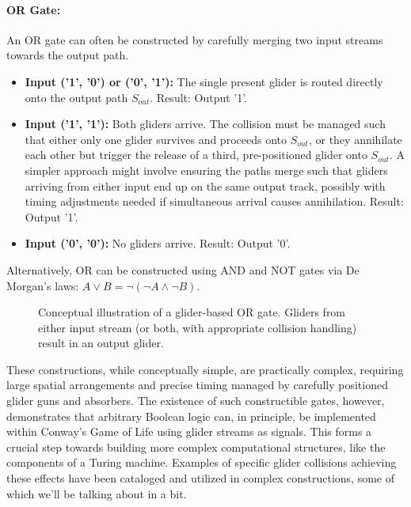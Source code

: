\documentclass{article}
\theoremstyle{definition}
\theoremstyle{plain}
\theoremstyle{plain}
\begin{document}
\paragraph{OR Gate:} An OR gate can often be constructed by carefully merging two input streams towards the output path.
\begin{itemize}
  \item \textbf{Input ('1', '0') or ('0', '1'):} The single present glider is routed directly onto the output path $S_{out}$. Result: Output '1'.
  \item \textbf{Input ('1', '1'):} Both gliders arrive. The collision must be managed such that either only one glider survives and proceeds onto $S_{out}$, or they annihilate each other but trigger the release of a third, pre-positioned glider onto $S_{out}$. A simpler approach might involve ensuring the paths merge such that gliders arriving from either input end up on the same output track, possibly with timing adjustments needed if simultaneous arrival causes annihilation. Result: Output '1'.
  \item \textbf{Input ('0', '0'):} No gliders arrive. Result: Output '0'.
\end{itemize}
Alternatively, OR can be constructed using AND and NOT gates via De Morgan's laws: $A \lor B = \neg (\neg A \land \neg B)$.

\begin{figure}[H]
  \centering
  \caption{Conceptual illustration of a glider-based OR gate. Gliders from either input stream (or both, with appropriate collision handling) result in an output glider.}
  \label{fig:or-gate}
\end{figure}

These constructions, while conceptually simple, are practically complex, requiring large spatial arrangements and precise timing managed by carefully positioned glider guns and absorbers. The existence of such constructible gates, however, demonstrates that arbitrary Boolean logic can, in principle, be implemented within Conway's Game of Life using glider streams as signals. This forms a crucial step towards building more complex computational structures, like the components of a Turing machine. Examples of specific glider collisions achieving these effects have been cataloged and utilized in complex constructions, some of which we'll be talking about in a bit.
\end{document}
